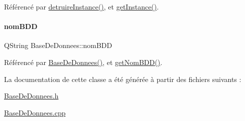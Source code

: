 Référencé par \hyperlink{class_base_de_donnees_a457401c0816b888c77ce915997545f4e}{detruire\+Instance()}, et \hyperlink{class_base_de_donnees_a1cea5a739386ba076c7f265205e82608}{get\+Instance()}.

\mbox{\label{class_base_de_donnees_a67c1d973c267a8f5fd6d7461550faa11}} 
\paragraph{\texorpdfstring{nom\+B\+DD}{nomBDD}}
{\footnotesize\ttfamily Q\+String Base\+De\+Donnees\+::nom\+B\+DD\hspace{0.3cm}{\ttfamily [private]}}



Référencé par \hyperlink{class_base_de_donnees_ac4d0c514f439b3a19dc35c159955373a}{Base\+De\+Donnees()}, et \hyperlink{class_base_de_donnees_a467909531ae3cdebaf173f6e97cdc624}{get\+Nom\+B\+D\+D()}.



La documentation de cette classe a été générée à partir des fichiers suivants \+:\begin{DoxyCompactItemize}
\item 
\hyperlink{_base_de_donnees_8h}{Base\+De\+Donnees.\+h}\item 
\hyperlink{_base_de_donnees_8cpp}{Base\+De\+Donnees.\+cpp}\end{DoxyCompactItemize}
